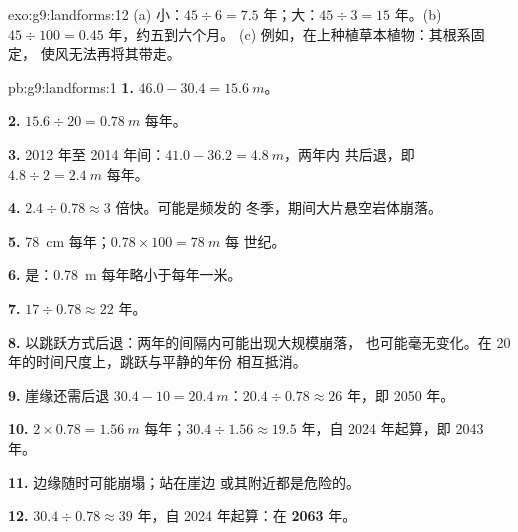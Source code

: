 \begin{solution}{exo:g9:landforms:12}
(a) 小：$45 \div 6 = 7.5$ 年；大：$45 \div 3 =
15$ 年。(b) $45 \div 100 = 0.45$ 年，约五到六个月。
(c) 例如，在上种植草本植物：其根系固定，
使风无法再将其带走。
\end{solution}

\begin{solution}{pb:g9:landforms:1}
\textbf{1.} $46.0 - 30.4 = \qty{15.6}{m}$。

\textbf{2.} $15.6 \div 20 = \qty{0.78}{m}$ 每年。

\textbf{3.} 2012 年至 2014 年间：$41.0 - 36.2 = \qty{4.8}{m}$，两年内
共后退，即 $4.8 \div 2 = \qty{2.4}{m}$ 每年。

\textbf{4.} $2.4 \div 0.78 \approx 3$ 倍快。可能是频发的
冬季，期间大片悬空岩体崩落。

\textbf{5.} \qty{78}{cm} 每年；$0.78 \times 100 = \qty{78}{m}$ 每
世纪。

\textbf{6.} 是：\qty{0.78}{m} 每年略小于每年一米。

\textbf{7.} $17 \div 0.78 \approx 22$ 年。

\textbf{8.} 以跳跃方式后退：两年的间隔内可能出现大规模崩落，
也可能毫无变化。在 20 年的时间尺度上，跳跃与平静的年份
相互抵消。

\textbf{9.} 崖缘还需后退 $30.4 - 10 = \qty{20.4}{m}$：$20.4 \div 0.78
\approx 26$ 年，即 2050 年。

\textbf{10.} $2 \times 0.78 = \qty{1.56}{m}$ 每年；$30.4 \div 1.56
\approx 19.5$ 年，自 2024 年起算，即 2043 年。

\textbf{11.} 边缘随时可能崩塌；站在崖边
或其附近都是危险的。

\textbf{12.} $30.4 \div 0.78 \approx 39$ 年，自 2024 年起算：在
\textbf{2063} 年。
\end{solution}

